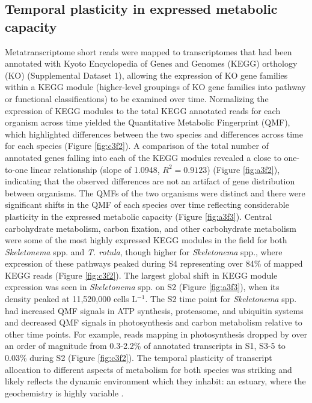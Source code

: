 \subsection{Temporal plasticity in expressed metabolic capacity} 
Metatranscriptome short reads were mapped to transcriptomes that had been annotated with Kyoto Encyclopedia of Genes and Genomes (KEGG) orthology (KO) (Supplemental Dataset 1), allowing the expression of KO gene families within a KEGG module (higher-level groupings of KO gene families into pathway or functional classifications) to be examined over time. Normalizing the expression of KEGG modules to the total KEGG annotated reads for each organism across time yielded the Quantitative Metabolic Fingerprint (QMF), which highlighted differences between the two species and differences across time for each species (Figure \ref{fig:c3f2}). A comparison of the total number of annotated genes falling into each of the KEGG modules revealed a close to one-to-one linear relationship (slope of 1.0948, $R^{2}=0.9123$) (Figure \ref{fig:a3f2}), indicating that the observed differences are not an artifact of gene distribution between organisms. The QMFs of the two organisms were distinct and there were significant shifts in the QMF of each species over time reflecting considerable plasticity in the expressed metabolic capacity (Figure \ref{fig:a3f3}). Central carbohydrate metabolism, carbon fixation, and other carbohydrate metabolism were some of the most highly expressed KEGG modules in the field for both \textit{Skeletonema} spp. and \textit{T. rotula}, though higher for \textit{Skeletonema} spp., where expression of these pathways peaked during S4 representing over 84\% of mapped KEGG reads (Figure \ref{fig:c3f2}). The largest global shift in KEGG module expression was seen in \textit{Skeletonema} spp. on S2 (Figure \ref{fig:a3f3}), when its density peaked at 11,520,000 cells L$^{-1}$. The S2 time point for \textit{Skeletonema} spp. had increased QMF signals in ATP synthesis, proteasome, and ubiquitin systems and decreased QMF signals in photosynthesis and carbon metabolism relative to other time points. For example, reads mapping in photosynthesis dropped by over an order of magnitude from 0.3-2.2\% of annotated transcripts in S1, S3-5 to 0.03\% during S2 (Figure \ref{fig:c3f2}). The temporal plasticity of transcript allocation to different aspects of metabolism for both species was striking and likely reflects the dynamic environment which they inhabit: an estuary, where the geochemistry is highly variable \citep{Nixon1995}.\par

